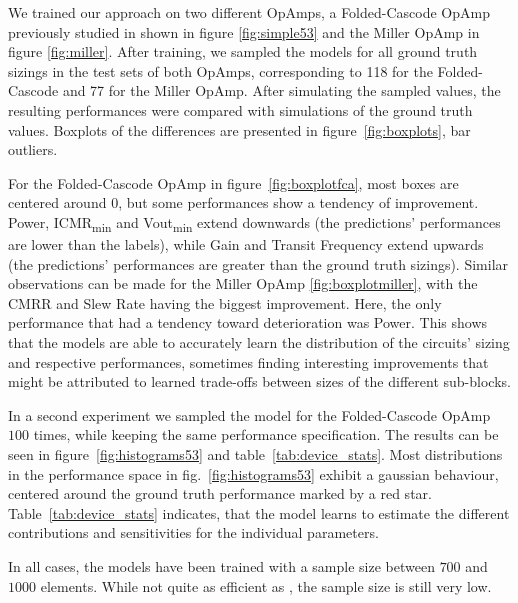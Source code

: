 \documentclass[conference]{IEEEtran}
\begin{document}
	We trained our approach on two different OpAmps, a Folded-Cascode OpAmp previously studied in \cite{leibl24inverse} shown in figure \ref{fig:simple53} and the Miller OpAmp in figure \ref{fig:miller}. After training, we sampled the models for all ground truth sizings in the test sets of both OpAmps, corresponding to 118 for the Folded-Cascode and 77 for the Miller OpAmp. After simulating the sampled values, the resulting performances were compared with simulations of the ground truth values. Boxplots of the differences are presented in figure~\ref{fig:boxplots}, bar outliers.%

	
	For the Folded-Cascode OpAmp in figure~\ref{fig:boxplotfca}, most boxes are centered around 0, but some performances show a tendency of improvement. Power, ICMR\textsubscript{min} and Vout\textsubscript{min} extend downwards (the predictions' performances are lower than the labels), while Gain and Transit Frequency extend upwards (the predictions' performances are greater than the ground truth sizings). Similar observations can be made for the Miller OpAmp \ref{fig:boxplotmiller}, with the CMRR and Slew Rate having the biggest improvement. Here, the only performance that had a tendency toward deterioration was Power. This shows that the models are able to accurately learn the distribution of the circuits' sizing and respective performances, sometimes finding interesting improvements that might be attributed to learned trade-offs between sizes of the different sub-blocks.
	
	In a second experiment we sampled the model for the Folded-Cascode OpAmp $100$ times, while keeping the same performance specification. The results can be seen in figure~\ref{fig:histograms53} and table~\ref{tab:device_stats}. Most distributions in the performance space in fig.~\ref{fig:histograms53} exhibit a gaussian behaviour, centered around the ground truth performance marked by a red star. Table~\ref{tab:device_stats} indicates, that the model learns to estimate the different contributions and sensitivities for the individual parameters. 
	
	In all cases, the models have been trained with a sample size between $700$ and $1000$ elements. While not quite as efficient as \cite{leibl24inverse}, the sample size is still very low.
\end{document}
